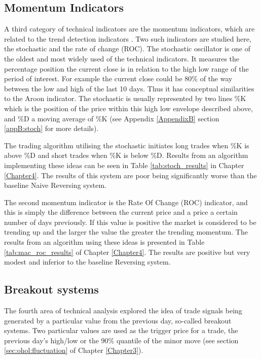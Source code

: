 \subsection{Momentum Indicators}
A third category of technical indicators are the momentum indicators, which are related to the trend detection indicators \citep{Menkhoff2012660}. Two such indicators are studied here, the stochastic and the rate of change (ROC). The stochastic oscillator is one of the oldest and most widely used of the technical indicators. It measures the percentage position the current close is in relation to the high low range of the period of interest. For example the current close could be 80\% of the way between the low and high of the last 10 days. Thus it has conceptual similarities to the Aroon indicator. The stochastic is usually represented by two lines \%K which is the position of the price within this high low envelope described above, and \%D a moving average of \%K (see Appendix \ref{AppendixB} section \ref{appB:stoch} for more details). 

The trading algorithm utilising the stochastic initiates long trades when \%K is above \%D and short trades when \%K is below \%D. Results from an algorithm implementing these ideas can be seen in  Table \ref{tab:stoch_results} in Chapter \ref{Chapter4}. The results of this system are poor being significantly worse than the baseline Naive Reversing system. 


The second momentum indicator is the Rate Of Change (ROC) indicator, and this is simply the difference between the current price and a price a certain number of days previously. If this value is positive the market is considered to be trending up and the larger the value the greater the trending momentum. The results from an algorithm using these ideas is presented in Table \ref{tab:mac_roc_results} of Chapter \ref{Chapter4}. The results are positive but very modest and inferior to the baseline Reversing system.

\subsection{Breakout systems}
The fourth area of technical analysis explored the idea of trade signals being generated by a particular value from the previous day, so-called breakout systems. Two particular values are used as the trigger price for a trade, the previous day's high/low or the 90\% quantile of the minor move (see section \ref{sec:ohol:fluctuation} of Chapter \ref{Chapter3}). 

